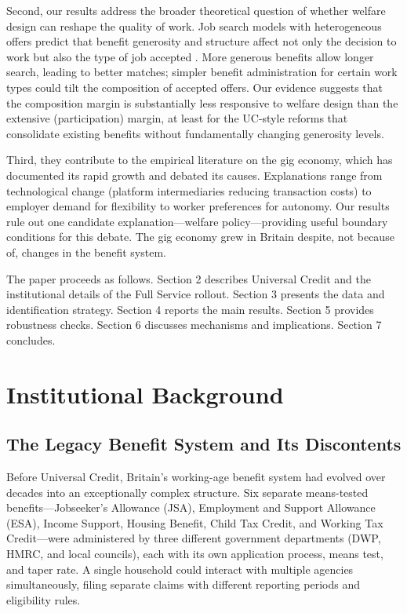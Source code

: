 \documentclass[12pt]{article}
\begin{document}
Second, our results address the broader theoretical question of whether welfare design can reshape the quality of work. Job search models with heterogeneous offers predict that benefit generosity and structure affect not only the decision to work but also the type of job accepted \citep{acemogluProductivityGainsJob2001}. More generous benefits allow longer search, leading to better matches; simpler benefit administration for certain work types could tilt the composition of accepted offers. Our evidence suggests that the composition margin is substantially less responsive to welfare design than the extensive (participation) margin, at least for the UC-style reforms that consolidate existing benefits without fundamentally changing generosity levels.

Third, they contribute to the empirical literature on the gig economy, which has documented its rapid growth \citep{katzRiseAlternativeWork2019} and debated its causes. Explanations range from technological change (platform intermediaries reducing transaction costs) to employer demand for flexibility to worker preferences for autonomy. Our results rule out one candidate explanation---welfare policy---providing useful boundary conditions for this debate. The gig economy grew in Britain despite, not because of, changes in the benefit system.

The paper proceeds as follows. Section 2 describes Universal Credit and the institutional details of the Full Service rollout. Section 3 presents the data and identification strategy. Section 4 reports the main results. Section 5 provides robustness checks. Section 6 discusses mechanisms and implications. Section 7 concludes.


\section{Institutional Background}

\subsection{The Legacy Benefit System and Its Discontents}

Before Universal Credit, Britain's working-age benefit system had evolved over decades into an exceptionally complex structure. Six separate means-tested benefits---Jobseeker's Allowance (JSA), Employment and Support Allowance (ESA), Income Support, Housing Benefit, Child Tax Credit, and Working Tax Credit---were administered by three different government departments (DWP, HMRC, and local councils), each with its own application process, means test, and taper rate. A single household could interact with multiple agencies simultaneously, filing separate claims with different reporting periods and eligibility rules.
\end{document}
